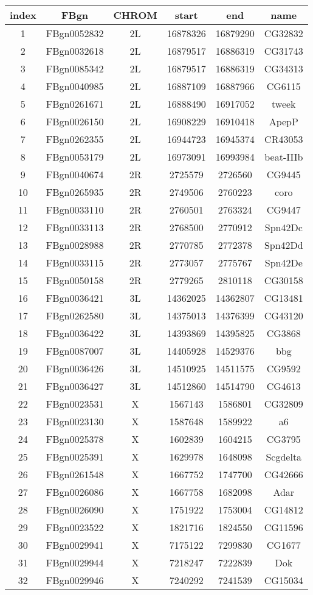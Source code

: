 \centering \begin{tabular}{c|c|c|c|c|c}
index	&FBgn	&CHROM	&start	&end	&name\\\hline
1	&FBgn0052832	&2L	&16878326	&16879290	&CG32832\\
2	&FBgn0032618	&2L	&16879517	&16886319	&CG31743\\
3	&FBgn0085342	&2L	&16879517	&16886319	&CG34313\\
4	&FBgn0040985	&2L	&16887109	&16887966	&CG6115\\
5	&FBgn0261671	&2L	&16888490	&16917052	&tweek\\
6	&FBgn0026150	&2L	&16908229	&16910418	&ApepP\\
7	&FBgn0262355	&2L	&16944723	&16945374	&CR43053\\
8	&FBgn0053179	&2L	&16973091	&16993984	&beat-IIIb\\
9	&FBgn0040674	&2R	&2725579	&2726560	&CG9445\\
10	&FBgn0265935	&2R	&2749506	&2760223	&coro\\
11	&FBgn0033110	&2R	&2760501	&2763324	&CG9447\\
12	&FBgn0033113	&2R	&2768500	&2770912	&Spn42Dc\\
13	&FBgn0028988	&2R	&2770785	&2772378	&Spn42Dd\\
14	&FBgn0033115	&2R	&2773057	&2775767	&Spn42De\\
15	&FBgn0050158	&2R	&2779265	&2810118	&CG30158\\
16	&FBgn0036421	&3L	&14362025	&14362807	&CG13481\\
17	&FBgn0262580	&3L	&14375013	&14376399	&CG43120\\
18	&FBgn0036422	&3L	&14393869	&14395825	&CG3868\\
19	&FBgn0087007	&3L	&14405928	&14529376	&bbg\\
20	&FBgn0036426	&3L	&14510925	&14511575	&CG9592\\
21	&FBgn0036427	&3L	&14512860	&14514790	&CG4613\\
22	&FBgn0023531	&X	&1567143	&1586801	&CG32809\\
23	&FBgn0023130	&X	&1587648	&1589922	&a6\\
24	&FBgn0025378	&X	&1602839	&1604215	&CG3795\\
25	&FBgn0025391	&X	&1629978	&1648098	&Scgdelta\\
26	&FBgn0261548	&X	&1667752	&1747700	&CG42666\\
27	&FBgn0026086	&X	&1667758	&1682098	&Adar\\
28	&FBgn0026090	&X	&1751922	&1753004	&CG14812\\
29	&FBgn0023522	&X	&1821716	&1824550	&CG11596\\
30	&FBgn0029941	&X	&7175122	&7299830	&CG1677\\
31	&FBgn0029944	&X	&7218247	&7222839	&Dok\\
32	&FBgn0029946	&X	&7240292	&7241539	&CG15034\\
\end{tabular}

